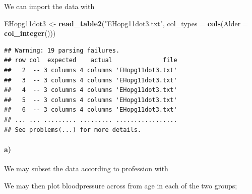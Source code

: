 \documentclass[
]{article}
\newenvironment{Shaded}{\begin{snugshade}}{\end{snugshade}}
\newcommand{\DataTypeTok}[1]{\textcolor[rgb]{0.13,0.29,0.53}{#1}}
\newcommand{\KeywordTok}[1]{\textcolor[rgb]{0.13,0.29,0.53}{\textbf{#1}}}
\newcommand{\NormalTok}[1]{#1}
\newcommand{\OperatorTok}[1]{\textcolor[rgb]{0.81,0.36,0.00}{\textbf{#1}}}
\newcommand{\StringTok}[1]{\textcolor[rgb]{0.31,0.60,0.02}{#1}}
\begin{document}
We can import the data with

\begin{Shaded}
\begin{Highlighting}[]
\NormalTok{EHopg11dot3 <-}\StringTok{ }\KeywordTok{read_table2}\NormalTok{(}\StringTok{"EHopg11dot3.txt"}\NormalTok{, }
    \DataTypeTok{col_types =} \KeywordTok{cols}\NormalTok{(}\DataTypeTok{Alder =} \KeywordTok{col_integer}\NormalTok{()))}
\end{Highlighting}
\end{Shaded}

\begin{verbatim}
## Warning: 19 parsing failures.
## row col  expected    actual              file
##   2  -- 3 columns 4 columns 'EHopg11dot3.txt'
##   3  -- 3 columns 4 columns 'EHopg11dot3.txt'
##   4  -- 3 columns 4 columns 'EHopg11dot3.txt'
##   5  -- 3 columns 4 columns 'EHopg11dot3.txt'
##   6  -- 3 columns 4 columns 'EHopg11dot3.txt'
## ... ... ......... ......... .................
## See problems(...) for more details.
\end{verbatim}

\hypertarget{a-1}{%
\paragraph{\texorpdfstring{\textbf{a)}}{a)}}\label{a-1}}

We may subset the data according to profession with

\begin{Shaded}
\end{Shaded}

We may then plot bloodpressure across from age in each of the two
groups;

\begin{Shaded}
\end{Shaded}
\end{document}
